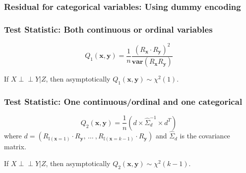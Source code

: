 \documentclass{beamer}
\def\ci{\perp\!\!\!\!\!\perp}
\begin{document}
\begin{frame}
	\frametitle{Residual for categorical variables: Using dummy encoding}
\end{frame}

\begin{frame}
	\frametitle{Test Statistic: Both continuous or ordinal variables}
	$$ Q_1(\bm{x}, \bm{y}) = \frac{1}{n} \frac{(R_{\bm{x}} \cdot R_{\bm{y}})^2}{\bm{var}(R_{\bm{x}} R_{\bm{y}})} $$
	\begin{center}
	If $ X \ci Y | Z $, then asymptotically $ Q_1(\bm{x}, \bm{y}) \sim \chi^2(1) $.
	\end{center}


\end{frame}

\begin{frame}
	\frametitle{Test Statistic: One continuous/ordinal and one categorical}
	$$ Q_2(\bm{x}, \bm{y}) = \frac{1}{n} (d \times \hat{\Sigma}_d^{-1} \times d^T) $$
	where $ d = (R_{\mathbb{I}(\mathbf{x}=1)} \cdot R_{\mathbf{y}}, \, \ldots \ ,
		R_{\mathbb{I}(\mathbf{x}=k-1)} \cdot R_{\mathbf{y}})$ and $ \hat{\Sigma}_d $ is the covariance matrix.

	\vspace{1em}
	\begin{center}
		If $ X \ci Y | Z $, then asymptotically $ Q_2(\bm{x}, \bm{y}) \sim \chi^2(k-1) $.
	\end{center}


\end{frame}
\end{document}
